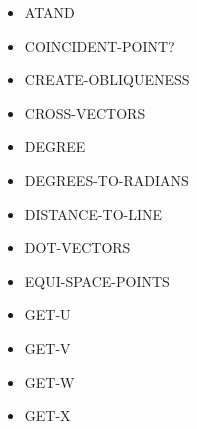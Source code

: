 \documentclass [11pt]{book}
\begin{document}
\begin{itemize}
\item {}ATAND





\item {}COINCIDENT-POINT?





\item {}CREATE-OBLIQUENESS





\item {}CROSS-VECTORS





\item {}DEGREE





\item {}DEGREES-TO-RADIANS





\item {}DISTANCE-TO-LINE





\item {}DOT-VECTORS





\item {}EQUI-SPACE-POINTS





\item {}GET-U





\item {}GET-V





\item {}GET-W





\item {}GET-X






\end{itemize}
\end{document}
